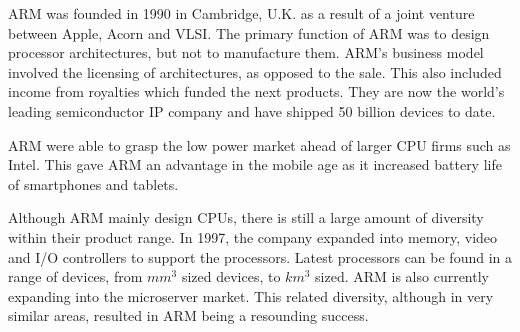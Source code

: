ARM was founded in 1990 in Cambridge, U.K. as a result of a joint venture between Apple, Acorn and VLSI.
The primary function of ARM was to design processor architectures, but not to manufacture them.
ARM's business model involved the licensing of architectures, as opposed to the sale. 
This also included income from royalties which funded the next products.
They are now the world's leading semiconductor IP company and have shipped 50 billion devices to date.

ARM were able to grasp the low power market ahead of larger CPU firms such as Intel. 
This gave ARM an advantage in the mobile age as it increased battery life of smartphones and tablets.

Although ARM mainly design CPUs, there is still a large amount of diversity within their product range.
In 1997, the company expanded into memory, video and I/O controllers to support the processors.
Latest processors can be found in a range of devices, from $mm^{3}$ sized devices, to $km^{3}$ sized. 
ARM is also currently expanding into the microserver market.
This related diversity, although in very similar areas, resulted in ARM being a resounding success.


